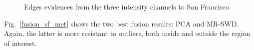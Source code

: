 \documentclass[journal]{IEEEtran}
\begin{document}
\begin{figure}[hbt]
	\centering
	\caption{Edges evidences from the three intensity channels to San Francisco}
	\label{evidencias_sf_hh_hv_vv} 
\end{figure}

Fig.~\ref{fusion_sf_met} shows the two best fusion results: PCA and MR-SWD.
Again, the latter is more resistant to outliers, both inside and outside the region of interest.
\end{document}
